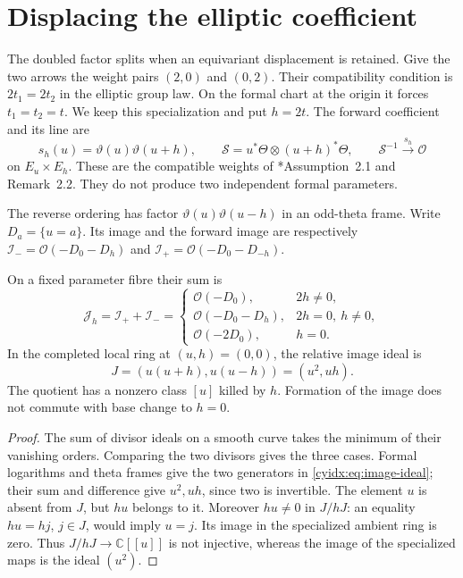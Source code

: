 \section{Displacing the elliptic coefficient}
\label{cyidx:sec:shift}

The doubled factor splits when an equivariant displacement
is retained. Give the two arrows the weight pairs
\((2,0)\) and \((0,2)\). Their compatibility condition
is \(2t_1=2t_2\) in the elliptic group law. On the
formal chart at the origin it forces \(t_1=t_2=t\).
We keep this specialization and put \(h=2t\).
The forward coefficient and its line are
\begin{equation}\label{cyidx:eq:shifted-pair}
 s_h(u)=\vartheta(u)\vartheta(u+h),\qquad
 \mathcal S=u^*\Theta\otimes(u+h)^*\Theta,
 \qquad\mathcal S^{-1}\xrightarrow{s_h}\mathcal O
\end{equation}
on \(E_u\times E_h\). These are the compatible weights
of \cite{YangZhaoElliptic}*{Assumption~2.1 and Remark~2.2}.
They do not produce two independent formal parameters.

The reverse ordering has factor
\(\vartheta(u)\vartheta(u-h)\) in an odd-theta frame.
Write \(D_a=\{u=a\}\). Its image and the forward image
are respectively
\(\mathcal I_-=\mathcal O(-D_0-D_h)\) and
\(\mathcal I_+=\mathcal O(-D_0-D_{-h})\).

\begin{proposition}\label{cyidx:prop:ordered-image}
On a fixed parameter fibre their sum is
\[
 \mathcal J_h=\mathcal I_++\mathcal I_-=
 \begin{cases}
 \mathcal O(-D_0),&2h\ne0,\\
 \mathcal O(-D_0-D_h),&2h=0,\ h\ne0,\\
 \mathcal O(-2D_0),&h=0.
 \end{cases}
\]
In the completed local ring at \((u,h)=(0,0)\), the
relative image ideal is
\begin{equation}\label{cyidx:eq:image-ideal}
 J=(u(u+h),u(u-h))=(u^2,uh).
\end{equation}
The quotient has a nonzero class \([u]\) killed by \(h\).
Formation of the image does not commute with base change
to \(h=0\).
\end{proposition}
\begin{proof}
The sum of divisor ideals on a smooth curve takes the
minimum of their vanishing orders. Comparing the two
divisors gives the three cases. Formal logarithms and
theta frames give the two generators in
\eqref{cyidx:eq:image-ideal}; their sum and difference
give \(u^2,uh\), since two is invertible.
The element \(u\) is absent from \(J\), but \(hu\)
belongs to it. Moreover \(hu\ne0\) in \(J/hJ\):
an equality \(hu=hj\), \(j\in J\), would imply
\(u=j\). Its image in the specialized ambient ring
is zero. Thus \(J/hJ\to\mathbb C[[u]]\) is not
injective, whereas the image of the specialized maps
is the ideal \((u^2)\).
\end{proof}

